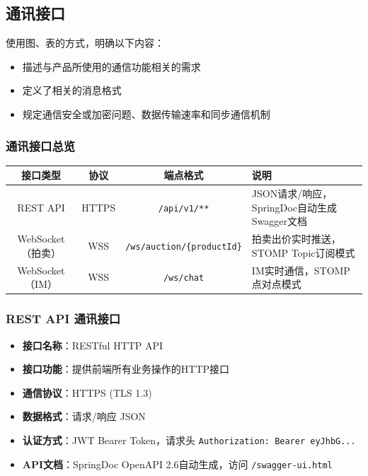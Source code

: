 \documentclass[12pt,a4paper]{ctexart}
\numberwithin{figure}{section}
\numberwithin{table}{section}
\begin{document}
\subsection{通讯接口}

使用图、表的方式，明确以下内容：

\begin{itemize}
    \item 描述与产品所使用的通信功能相关的需求
    \item 定义了相关的消息格式
    \item 规定通信安全或加密问题、数据传输速率和同步通信机制
\end{itemize}

\subsubsection{通讯接口总览}

\begin{center}
\renewcommand{\arraystretch}{1.3}
\begin{tabular}{|c|c|c|p{7cm}|}
\hline
\rowcolor{tableheader}
\textbf{接口类型} & \textbf{协议} & \textbf{端点格式} & \textbf{说明} \\
\hline
REST API & HTTPS & \verb|/api/v1/**| & JSON请求/响应，SpringDoc自动生成Swagger文档 \\
\hline
WebSocket（拍卖） & WSS & \verb|/ws/auction/{productId}| & 拍卖出价实时推送，STOMP Topic订阅模式 \\
\hline
WebSocket（IM） & WSS & \verb|/ws/chat| & IM实时通信，STOMP点对点模式 \\
\hline
\end{tabular}
\end{center}

\subsubsection{REST API 通讯接口}

\begin{itemize}
    \item \textbf{接口名称}：RESTful HTTP API
    \item \textbf{接口功能}：提供前端所有业务操作的HTTP接口
    \item \textbf{通信协议}：HTTPS (TLS 1.3)
    \item \textbf{数据格式}：请求/响应 JSON
    \item \textbf{认证方式}：JWT Bearer Token，请求头 \verb|Authorization: Bearer eyJhbG...|
    \item \textbf{API文档}：SpringDoc OpenAPI 2.6自动生成，访问 \verb|/swagger-ui.html|
\end{itemize}
\end{document}
